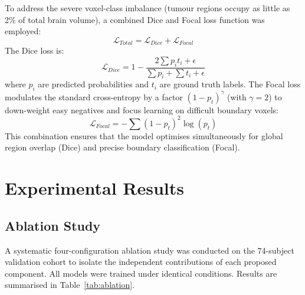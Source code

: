 \documentclass[conference]{IEEEtran}
\begin{document}
To address the severe voxel-class imbalance (tumour regions occupy as little as 2\% of total brain volume), a combined Dice and Focal loss function was employed:
\begin{equation}
    \mathcal{L}_{Total} = \mathcal{L}_{Dice} + \mathcal{L}_{Focal}
\end{equation}
The Dice loss \cite{milletari2016v} is:
\begin{equation}
    \mathcal{L}_{Dice} = 1 - \frac{2 \sum p_i t_i + \epsilon}{\sum p_i + \sum t_i + \epsilon}
\end{equation}
where $p_i$ are predicted probabilities and $t_i$ are ground truth labels. The Focal loss \cite{lin2017focal} modulates the standard cross-entropy by a factor $(1-p_t)^\gamma$ (with $\gamma=2$) to down-weight easy negatives and focus learning on difficult boundary voxels:
\begin{equation}
    \mathcal{L}_{Focal} = -\sum (1-p_t)^2 \log(p_t)
\end{equation}
This combination ensures that the model optimises simultaneously for global region overlap (Dice) and precise boundary classification (Focal).

\section{Experimental Results}
\label{sec:results}

\subsection{Ablation Study}
A systematic four-configuration ablation study was conducted on the 74-subject validation cohort to isolate the independent contributions of each proposed component. All models were trained under identical conditions. Results are summarised in Table~\ref{tab:ablation}.
\end{document}
